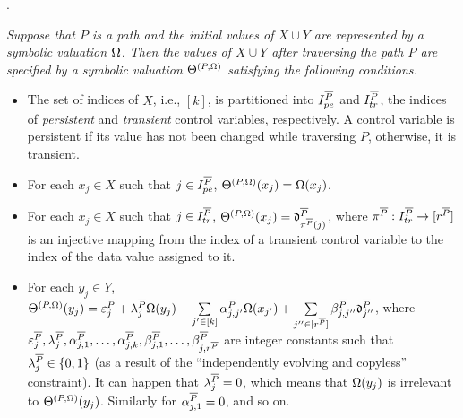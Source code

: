 \begin{appendix}
.
{\it Suppose that $P$ is a path and the initial values of $X \cup Y$ are represented by a symbolic valuation $\Omega$. Then the values of $X \cup Y$ after traversing the path $P$ are specified by a symbolic valuation $\Theta^{(P,\Omega)}$ satisfying the following conditions.
\begin{itemize}
\item The set of indices of $X$, i.e., $[k]$, is partitioned into $I^{\overline{P}}_{pe}$ and $I^{\overline{P}}_{tr}$, the indices of \emph{persistent} and \emph{transient} control variables, respectively. A control variable is persistent if its value has not been changed while traversing $P$, otherwise, it is transient.
\item For each $x_j\in X$ such that $j\in I^{\overline{P}}_{pe}$, $\Theta^{(P,\Omega)}(x_j)=\Omega(x_j)$.
%
\item  For each $x_j\in X$ such that $j\in I^{\overline{P}}_{tr}$,
$\Theta^{(P,\Omega)}(x_j)=\mathfrak{d}^{\overline{P}}_{\pi^{\overline{P}}(j)}$, where $\pi^{\overline{P}}: I^{\overline{P}}_{tr} \rightarrow [r^{\overline{P}}]$ is an injective mapping from the index of a transient control variable to the index of the data value assigned to it.
% 
\item For each $y_j \in Y$, 
$
 \Theta^{(P,\Omega)}(y_j)  =
 \varepsilon^{\overline{P}}_{j} + 
 \lambda^{\overline{P}}_j \Omega(y_j)  + 
  \sum\limits_{j'\in [k]}\alpha^{\overline{P}}_{j,j'}\Omega(x_{j'}) +
  \sum\limits_{j''\in [r^{\overline{P}}]}\beta^{\overline{P}}_{j,j''} \mathfrak{d}^{\overline{P}}_{j''}$,
where $\varepsilon^{\overline{P}}_j,\lambda^{\overline{P}}_j, \alpha^{\overline{P}}_{j,1},\dots,\alpha^{\overline{P}}_{j,k}, \beta^{\overline{P}}_{j,1},\dots,\beta^{\overline{P}}_{j,r^{\overline{P}}}$ are integer constants such that $\lambda^{\overline{P}}_{j} \in \{0,1\}$ (as a result of the ``independently evolving and copyless'' constraint).  It can happen that $\lambda^{\overline{P}}_j =0$,  which means that $\Omega(y_j)$ is irrelevant to $\Theta^{(P,\Omega)}(y_j)$. Similarly for $\alpha^{\overline{P}}_{j,1}=0$, and so on.
\end{itemize}
}


\end{appendix}
